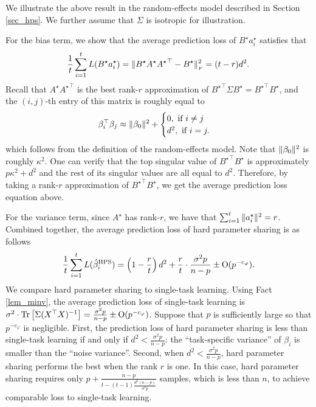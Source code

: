 \begin{example}\label{ex_same_cov}
We illustrate the above result in the random-effects model described in Section \ref{sec_hps}.
We further assume that $\Sigma$ is isotropic for illustration.

For the bias term, we show that the average prediction loss of $B^{\star} a_i^{\star}$ satisfies that
\[ \frac{1}{t} \sum_{i=1}^t L(B^{\star} a_i^{\star}) = \|B^{\star} A^{\star} {A^{\star}}^{\top} - B^{\star}\|_{_{F}}^2 = (t - r) d^2. \]
Recall that $A^{\star} {A^{\star}}^{\top}$ is the best rank-$r$ approximation of ${B^{\star}}^{\top}\Sigma B^{\star} = {B^{\star}}^{\top} B^{\star}$, and the $(i, j)$-th entry of this matrix is roughly equal to
\begin{align*}
	\beta_i^{\top} \beta_j \approx \|\beta_0\|^2 + \begin{cases}
																								0, \text{ if } i \neq j \\
																								d^2, \text{ if } i = j.
	\end{cases}
\end{align*}
which follows from the definition of the random-effects model.
Note that $\|\beta_0\|^2$ is roughly $\kappa^2$.
One can verify that the top singular value of ${B^{\star}}^{\top} B^{\star}$ is approximately $p \kappa^2 + d^2$ and the rest of its singular values are all equal to $d^2$.
Therefore, by taking a rank-$r$ approximation of ${B^{\star}}^{\top} B^{\star}$, we get the average prediction loss equation above.

For the variance term, since $A^{\star}$ has rank-$r$, we have that $\sum_{i=1}^t \|a_i^{\star}\|^2 = r$.
Combined together, the average prediction loss of hard parameter sharing is as follows
\[ \frac{1}{t}\sum_{i=1}^t L(\hat{\beta}_i^{\textup{HPS}}) = \left({1 - \frac{r}{t}}\right) d^2 + \frac{r}{t} \cdot \frac{\sigma^2 p}{n - p} \pm \operatorname{O}(p^{-c_{\varphi}}). \]
We compare hard parameter sharing to single-task learning.
Using Fact \ref{lem_minv}, the average prediction loss of single-task learning is $\sigma^2\cdot \operatorname{Tr}\left[\Sigma (X^{\top} X)^{-1}\right] = \frac{\sigma^2 p}{n - p} \pm \operatorname{O}(p^{-{c_{\varphi}}})$.
	Suppose that $p$ is sufficiently large so that $p^{-c_{\varphi}}$ is negligible.
First, the prediction loss of hard parameter sharing is less than single-task learning if and only if $d^2 < \frac{\sigma^2 p}{n - p}$: the ``task-specific variance'' of $\beta_i$ is smaller than the ``noise variance''.
Second, when $d^2 < \frac{\sigma^2 p}{n - p}$, hard parameter sharing performs the best when the rank $r$ is one.
	In this case, hard parameter sharing requires only $p + \frac{n - p}{t - (t - 1)\frac{d^2 (n - p)}{\sigma^2 p}}$ samples, which is less than $n$, to achieve comparable loss to single-task learning.


\end{example}
